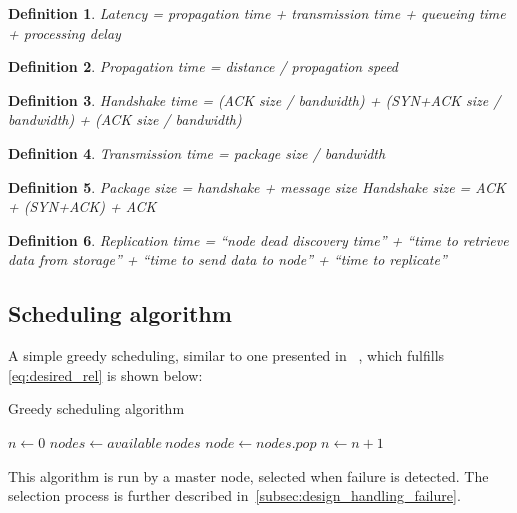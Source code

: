 \documentclass{cslthse-msc}
\newtheorem{definition}{Definition}[chapter]
\begin{document}
\begin{definition}
Latency = propagation time + transmission time + queueing time + processing delay
\end{definition}

\begin{definition}
Propagation time = distance / propagation speed
\end{definition}

\begin{definition}
Handshake time = (ACK size / bandwidth) + (SYN+ACK size / bandwidth) + (ACK size / bandwidth)	
\end{definition}

\begin{definition}
Transmission time = package size / bandwidth
\end{definition}

\begin{definition}
Package size = handshake + message size
Handshake size = ACK + (SYN+ACK) + ACK
\end{definition}

\begin{definition}
Replication time = “node dead discovery time” + “time to retrieve data from storage” + “time to send data to node” + “time to replicate”
\end{definition}

\subsection{Scheduling algorithm} \label{subsec:design_sched_alg}
A simple greedy scheduling, similar to one presented in ~\cite{effTaskReplMobGrid}, which fulfills \autoref{eq:desired_rel} is shown below:

\begin{algorithm} 
	\caption{Greedy scheduling algorithm} \label{alg:scheduling}
	\begin{algorithmic}[1]
	\State $n\gets 0$
	\State $nodes\gets available\ nodes$
		\State $node\gets nodes.pop$
		\State
		\State $n\gets n + 1$
	\EndWhile
	\end{algorithmic}
\end{algorithm}

This algorithm is run by a master node, selected when failure is detected. The selection process is further described in~\autoref{subsec:design_handling_failure}.
\end{document}
